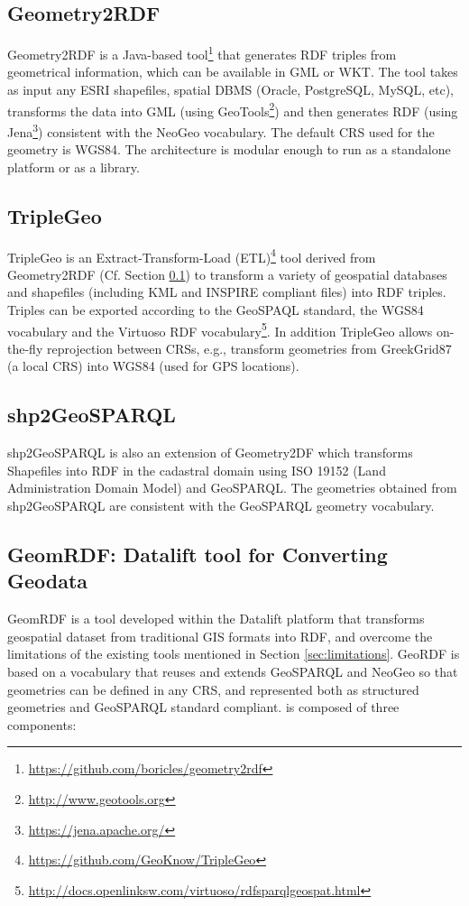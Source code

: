 \subsection{Geometry2RDF} \label{sec:geo2rdf}
Geometry2RDF \cite{deLeon2010} is a Java-based tool\footnote{\url{https://github.com/boricles/geometry2rdf}} that generates RDF triples from geometrical information, which can be available in GML or WKT. The tool takes as input any ESRI shapefiles, spatial DBMS (Oracle,  PostgreSQL, MySQL, etc), transforms the data into GML (using GeoTools\footnote{\url{http://www.geotools.org}}) and then generates RDF (using Jena\footnote{\url{https://jena.apache.org/}}) consistent with the NeoGeo vocabulary. The default CRS used for the geometry is WGS84. The architecture is modular enough to run as a standalone platform or as a library.

\subsection{TripleGeo}
TripleGeo \cite{triplegeo2014} is an Extract-Transform-Load (ETL)\footnote{\url{https://github.com/GeoKnow/TripleGeo}} tool derived from Geometry2RDF (Cf. Section \ref{sec:geo2rdf}) to transform a variety of geospatial databases and shapefiles (including KML and INSPIRE compliant files) into RDF triples. Triples can be exported according to the GeoSPAQL standard, the WGS84 vocabulary and the Virtuoso RDF vocabulary\footnote{\url{http://docs.openlinksw.com/virtuoso/rdfsparqlgeospat.html}}. In addition TripleGeo allows on-the-fly reprojection between CRSs, e.g., transform geometries from GreekGrid87 (a local CRS) into WGS84 (used for GPS locations).

\subsection{shp2GeoSPARQL}
shp2GeoSPARQL \cite{saavedra14} is also an extension of Geometry2DF which transforms Shapefiles into RDF in the cadastral domain using ISO 19152 \cite{iso2012} (Land Administration Domain Model) and GeoSPARQL. The geometries obtained from shp2GeoSPARQL are consistent with the GeoSPARQL geometry vocabulary.


\subsection{GeomRDF: Datalift tool for Converting Geodata}
\label{sec:geomRDF}
GeomRDF \cite{hamdi14} is a tool developed within the Datalift platform that transforms geospatial dataset from traditional GIS formats into RDF, and overcome the limitations of the existing tools mentioned in Section \ref{sec:limitations}. GeoRDF is based on a vocabulary that reuses and extends GeoSPARQL and NeoGeo so that geometries can be defined in any CRS, and represented both as structured geometries and GeoSPARQL standard compliant. \geom is composed of three components:

